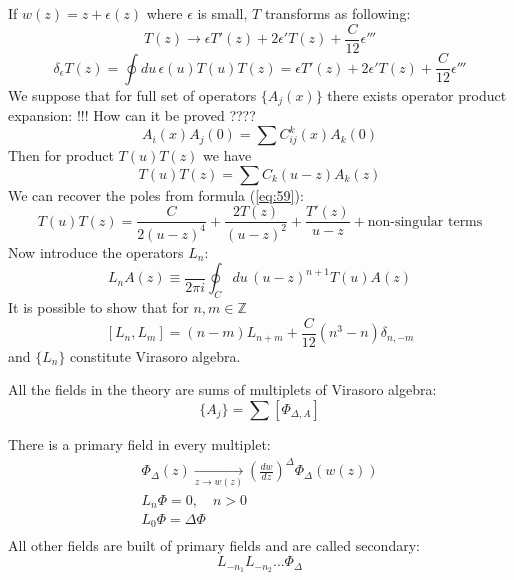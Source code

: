 \documentclass[a4paper,12pt]{article}
\theoremstyle{definition} \newtheorem{Def}{Definition}
\begin{document}
If $w(z)=z+\epsilon(z)$ where $\epsilon$ is small, $T$ transforms as following:
\begin{equation}
  \label{eq:58}
  T(z)\to \epsilon T'(z) + 2\epsilon' T(z)+\frac{C}{12}\epsilon'''
\end{equation}
\begin{equation}
  \label{eq:59}
  \delta_{\epsilon}T(z)=\oint du\, \epsilon(u) T(u) T(z) = \epsilon T'(z) + 2\epsilon' T(z)+\frac{C}{12}\epsilon'''
\end{equation}
We suppose that for full set of operators $\{A_j(x)\}$ there exists operator product expansion:
!!! How can it be proved ????
\begin{equation}
  \label{eq:60}
  A_i(x)A_j(0)=\sum C^k_{ij}(x)A_k(0)
\end{equation}
Then for product $T(u)T(z)$ we have
\begin{equation}
  \label{eq:61}
  T(u)T(z)=\sum C_k(u-z) A_k(z)
\end{equation}
We can recover the poles from formula (\ref{eq:59}):
\begin{equation}
  \label{eq:62}
  T(u)T(z)=\frac{C}{2(u-z)^4}+\frac{2T(z)}{(u-z)^2}+\frac{T'(z)}{u-z}+\mbox{non-singular terms}
\end{equation}
Now introduce the operators $L_n$:
\begin{equation}
  \label{eq:63}
  L_n A(z)\equiv \frac{}{2\pi i}\oint_{C}du\, (u-z)^{n+1}T(u)A(z)
\end{equation}
It is possible to show that for $n,m\in \mathbb{Z}$
\begin{equation}
  \label{eq:64}
  [L_n,L_m]=(n-m) L_{n+m}+\frac{C}{12}(n^3-n)\delta_{n,-m}
\end{equation}
and $\{L_n\}$ constitute Virasoro algebra. 

All the fields in the theory are sums of multiplets of Virasoro algebra:
\begin{equation}
  \label{eq:65}
  \{A_j\}=\sum [\Phi_{\Delta,A}] %
\end{equation}

There is a primary field in every multiplet:
\begin{equation}
  \label{eq:66}
  \begin{split}
    \Phi_{\Delta}(z)\underset{z\to w(z)}{\longrightarrow} \left(\frac{dw}{dz}\right)^{\Delta}\Phi_{\Delta}(w(z))\\
    L_n \Phi=0,\quad n>0\\
    L_0 \Phi=\Delta \Phi\\
  \end{split}
\end{equation}
All other fields are built of primary fields and are called secondary:
\begin{equation}
  \label{eq:67}
  L_{-n_1}L_{-n_2}\dots \Phi_{\Delta}
\end{equation}
\end{document}
